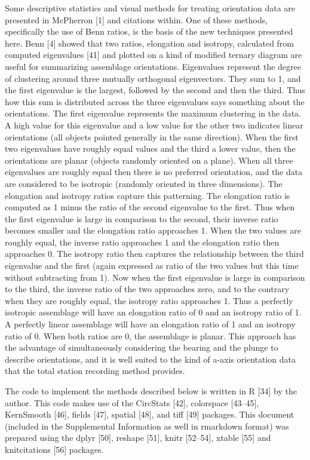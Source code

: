 \documentclass[]{article}
\begin{document}
Some descriptive statistics and visual methods for treating orientation
data are presented in McPherron {[}1{]} and citations within. One of
these methods, specifically the use of Benn ratios, is the basis of the
new techniques presented here. Benn {[}4{]} showed that two ratios,
elongation and isotropy, calculated from computed eigenvalues {[}41{]}
and plotted on a kind of modified ternary diagram are useful for
summarizing assemblage orientations. Eigenvalues represent the degree of
clustering around three mutually orthogonal eigenvectors. They sum to 1,
and the first eigenvalue is the largest, followed by the second and then
the third. Thus how this sum is distributed across the three eigenvalues
says something about the orientations. The first eigenvalue represents
the maximum clustering in the data. A high value for this eigenvalue and
a low value for the other two indicates linear orientations (all objects
pointed generally in the same direction). When the first two eigenvalues
have roughly equal values and the third a lower value, then the
orientations are planar (objects randomly oriented on a plane). When all
three eigenvalues are roughly equal then there is no preferred
orientation, and the data are considered to be isotropic (randomly
oriented in three dimensions). The elongation and isotropy ratios
capture this patterning. The elongation ratio is computed as 1 minus the
ratio of the second eigenvalue to the first. Thus when the first
eigenvalue is large in comparison to the second, their inverse ratio
becomes smaller and the elongation ratio approaches 1. When the two
values are roughly equal, the inverse ratio approaches 1 and the
elongation ratio then approaches 0. The isotropy ratio then captures the
relationship between the third eigenvalue and the first (again expressed
as ratio of the two values but this time without subtracting from 1).
Now when the first eigenvalue is large in comparison to the third, the
inverse ratio of the two approaches zero, and to the contrary when they
are roughly equal, the isotropy ratio approaches 1. Thus a perfectly
isotropic assemblage will have an elongation ratio of 0 and an isotropy
ratio of 1. A perfectly linear assemblage will have an elongation ratio
of 1 and an isotropy ratio of 0. When both ratios are 0, the assemblage
is planar. This approach has the advantage of simultaneously considering
the bearing and the plunge to describe orientations, and it is well
suited to the kind of a-axis orientation data that the total station
recording method provides.

The code to implement the methods described below is written in R
{[}34{]} by the author. This code makes use of the CircStats {[}42{]},
colorspace {[}43--45{]}, KernSmooth {[}46{]}, fields {[}47{]}, spatial
{[}48{]}, and tiff {[}49{]} packages. This document (included in the
Supplemental Information as well in rmarkdown format) was prepared using
the dplyr {[}50{]}, reshape {[}51{]}, knitr {[}52--54{]}, xtable
{[}55{]} and knitcitations {[}56{]} packages.
\end{document}
